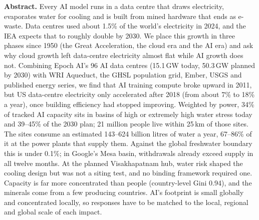 \textbf{Abstract.} Every AI model runs in a data centre that draws electricity, evaporates water for cooling and is
built from mined hardware that ends as e-waste. Data centres used about 1.5\% of the world's electricity in 2024, and
the IEA expects that to roughly double by 2030. We place this growth in three phases since 1950 (the Great
Acceleration, the cloud era and the AI era) and ask why cloud growth left data-centre electricity almost flat while AI
growth does not. Combining Epoch AI's 96 AI data centres (15.1\,GW today, 50.3\,GW planned by 2030) with WRI Aqueduct,
the GHSL population grid, Ember, USGS and published energy series, we find that AI training compute broke upward in
2011, but US data-centre electricity only accelerated after 2018 (from about 7\% to 18\% a year), once building
efficiency had stopped improving. Weighted by power, 34\% of tracked AI capacity sits in basins of high or extremely
high water stress today and 39--45\% of the 2030 plan; 21 million people live within 25\,km of those sites. The sites
consume an estimated 143--624 billion litres of water a year, 67--86\% of it at the power plants that supply them.
Against the global freshwater boundary this is under 0.1\%; in Google's Mesa basin, withdrawals already exceed supply in
all twelve months. At the planned Visakhapatnam hub, water risk shaped the cooling design but was not a siting test, and no binding framework required one. Capacity is far more concentrated than people (country-level Gini 0.94), and the minerals come from a
few producing countries. AI's footprint is small globally and concentrated locally, so responses have to be matched to
the local, regional and global scale of each impact.
